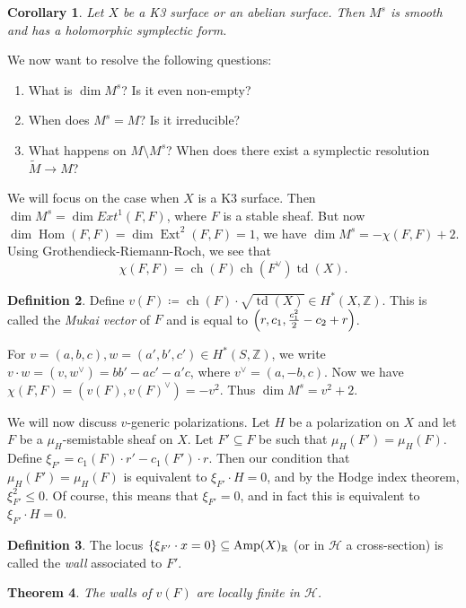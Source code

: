\documentclass[leqno, openany]{memoir}
\newtheorem{thm}{Theorem}[section]
\newtheorem{cor}[thm]{Corollary}
\theoremstyle{definition}
\newtheorem{defn}[thm]{Definition}
\theoremstyle{remark}
\theoremstyle{plain}
\theoremstyle{definition}
\theoremstyle{remark}
\newcommand{\R}{\mathbb{R}}
\newcommand{\Z}{\mathbb{Z}}
\newcommand{\mc}[1]{\mathcal{#1}}
\newcommand{\on}[1]{\operatorname{#1}}
\newcommand{\wt}[1]{\widetilde{#1}}
\DeclareMathOperator{\Hom}{Hom}
\DeclareMathOperator{\Ext}{Ext}
\begin{document}
\begin{cor}
    Let $X$ be a K3 surface or an abelian surface. Then $M^s$ is smooth and has a holomorphic symplectic form.
\end{cor}

We now want to resolve the following questions:
\begin{enumerate}
    \item What is $\dim M^s$? Is it even non-empty?
    \item When does $M^s = M$? Is it irreducible?
    \item What happens on $M \setminus M^s$? When does there exist a symplectic resolution $\wt{M} \to M$?
\end{enumerate}
We will focus on the case when $X$ is a K3 surface. Then $\dim M^s = \dim Ext^1(F, F)$, where $F$ is a stable sheaf. But now $\dim \Hom(F, F) = \dim \Ext^2(F, F) = 1$, we have $\dim M^s = - \chi(F, F) + 2$. Using Grothendieck-Riemann-Roch, we see that
\[ \chi(F, F) = \on{ch}(F) \on{ch}(F^{\vee}) \on{td}(X). \]

\begin{defn}
    Define $v(F) \coloneqq \on{ch}(F) \cdot \sqrt{\on{td}(X)} \in H^*(X, \Z)$. This is called the \textit{Mukai vector} of $F$ and is equal to $\qty(r, c_1, \frac{c_1^2}{2} - c_2 + r)$.
\end{defn}

For $v = (a,b,c), w = (a',b',c') \in H^*(S, \Z)$, we write $v \cdot w = (v, w^{\vee}) = bb' -ac'-a'c$, where $v^{\vee} = (a,-b,c)$. Now we have $\chi(F, F) = (v(F), v(F)^{\vee}) = -v^2$. Thus $\dim M^s = v^2 + 2$.

We will now discuss $v$-generic polarizations. Let $H$ be a polarization on $X$ and let $F$ be a $\mu_H$-semistable sheaf on $X$. Let $F' \subseteq F$ be such that $\mu_H(F') = \mu_H(F)$. Define $\xi_{F'} = c_1(F) \cdot r' - c_1(F') \cdot r$. Then our condition that $\mu_H(F') = \mu_H(F)$ is equivalent to $\xi_{F'} \cdot H = 0$, and by the Hodge index theorem, $\xi_{F'}^2 \leq 0$. Of course, this means that $\xi_{F'} = 0$, and in fact this is equivalent to $\xi_{F'} \cdot H = 0$.

\begin{defn}
    The locus $\qty{\xi_{F'} \cdot x = 0} \subseteq \on{Amp}(X)_{\R}$ (or in $\mc{H}$ a cross-section) is called the \textit{wall} associated to $F'$.
\end{defn}

\begin{thm}
    The walls of $v(F)$ are \textit{locally finite} in $\mc{H}$.
\end{thm}
\end{document}

